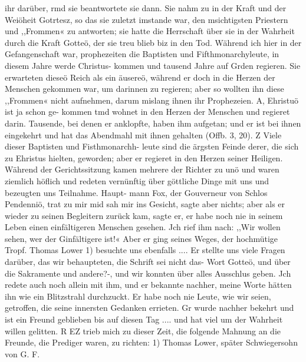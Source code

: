 ihr darüber, rmd sie beantwortete sie dann. Sie nahm zu in der
Kraft und der Weiöheit Gotrtesz, so das sie zuletzt imstande war,
den msichtigsten Priestern und ,,Frommen« zu antworten; sie hatte
die Herrschaft über sie in der Wahrheit durch die Kraft Gotteö,
der sie treu blieb biz in den Tod.
Während ich hier in der Gefangenschaft war, prophezeiten
die Baptisten und Fifthmonarchyleute, in diesem Jahre werde
Christus- kommen und tausend Jahre auf Grden regieren. Sie
erwarteten dieseö Reich als ein äusereö, während er doch in die
Herzen der Menschen gekommen war, um darinnen zu regieren;
aber so wollten ihn diese ,,Frommen« nicht aufnehmen, darum
mislang ihnen ihr Prophezeien. A, Ehristuö ist ja schon ge-
kommen tmd wohnet in den Herzen der Menschen und regieret
darin. Tausende, bei denen er anklopfte, haben ihm aufgetan;
und er ist bei ihnen eingekehrt und hat das Abendmahl mit ihnen
gehalten (Offb. 3, 20). Z Viele dieser Baptisten und Fisthmonarchh-
leute sind die ärgsten Feinde derer, die sich zu Ehristus hielten,
geworden; aber er regieret in den Herzen seiner Heiligen.
Während der Gerichtssitzung kamen mehrere der Richter zu
unö und waren ziemlich höflich und redeten vernünftig über
göttliche Dinge mit uns und bezeugten uns Teilnahme. Haupt-
mann Fox, der Gouverneur von Schlos Pendenniö, trat zu mir
mid sah mir ins Gesicht, sagte aber nichts; aber als er wieder
zu seinen Begleitern zurück kam, sagte er, er habe noch nie in
seinem Leben einen einfältigeren Menschen gesehen. Jch rief ihm
nach: ,,Wir wollen sehen, wer der Ginfältigere ist!« Aber er
ging seines Weges, der hochmütige Tropf.
Thomas Lower 1) besuchte uns ebenfalls .... Er stellte uns
viele Fragen darüber, das wir behaupteten, die Schrift sei nicht
das- Wort Gotteö, und über die Sakramente und andere?-, und
wir konnten über alles Ausschlus geben. Jch redete auch noch
allein mit ihm, und er bekannte nachher, meine Worte hätten
ihn wie ein Blitzstrahl durchzuckt. Er habe noch nie Leute, wie
wir seien, getroffen, die seine innersten Gedanken errieten. Gr
wurde nachher bekehrt und ist ein Freund geblieben bis auf diesen
Tag .... und hat viel um der Wahrheit willen gelitten. R
EZ trieb mich zu dieser Zeit, die folgende Mahnung an die
Freunde, die Prediger waren, zu richten:
1) Thomas Lower, später Schwiegersohn von G. F.



